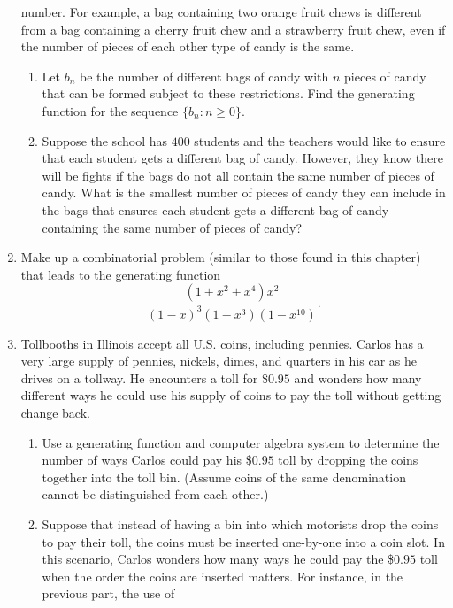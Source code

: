 \begin{enumerate}
  number. For example, a bag containing two orange fruit chews is
  different from a bag containing a cherry fruit chew and a strawberry
  fruit chew, even if the number of pieces of each other type of candy
  is the same. 
  \begin{enumerate}
  \item Let $b_n$ be the number of different bags of candy with $n$
    pieces of candy that can be formed subject to these restrictions.
    Find the generating function for the sequence $\{b_n\colon n\geq
    0\}$.
  \item Suppose the school has $400$ students and the teachers would
    like to ensure that each student gets a different bag of
    candy. However, they know there will be fights if the bags do not
    all contain the same number of pieces of candy. What is the
    smallest number of pieces of candy they can include in the bags
    that ensures each student gets a different bag of candy containing
    the same number of pieces of candy?
  \end{enumerate}
\item Make up a combinatorial problem (similar to those found in this
  chapter) that leads to the generating function
  \[\frac{(1+x^2+x^4)x^2}{(1-x)^3(1-x^3)(1-x^{10})}.\]
\item Tollbooths in Illinois accept all U.S. coins, including
  pennies. Carlos has a very large supply of pennies, nickels,
  dimes, and quarters in his car as he drives on a tollway. He
  encounters a toll for \$$0.95$ and wonders how many different
  ways he could use his supply of coins to pay the toll without
  getting change back. 
  \begin{enumerate}
  \item Use a generating function and computer algebra system to
    determine the number of ways Carlos could pay his \$$0.95$ toll by
    dropping the coins together into the toll bin. (Assume coins of
    the same denomination cannot be distinguished from each other.)
  \item Suppose that instead of having a bin into which motorists drop
    the coins to pay their toll, the coins must be inserted one-by-one
    into a coin slot. In this scenario, Carlos wonders how many ways
    he could pay the \$$0.95$ toll when the order the coins are
    inserted matters. For instance, in the previous part, the use of

\end{enumerate}
\end{enumerate}
